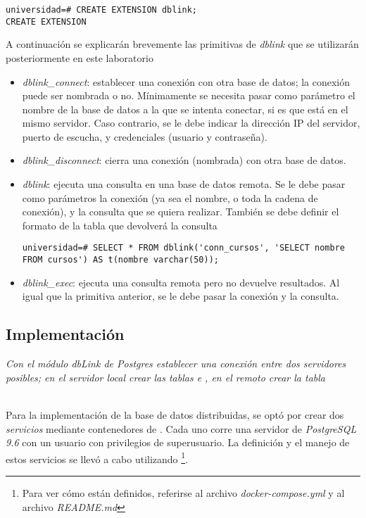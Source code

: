 \vspace*{5mm}
\begin{lstlisting}
universidad=# CREATE EXTENSION dblink;
CREATE EXTENSION
\end{lstlisting}

A continuación se explicarán brevemente las primitivas de \emph{dblink} que se utilizarán posteriormente en este laboratorio
\begin{itemize}
    \item \emph{dblink\_connect}: establecer una conexión con otra base de datos; la conexión puede ser nombrada o no. Mínimamente se necesita pasar como parámetro el nombre de la base de datos a la que se intenta conectar, si es que está en el mismo servidor. Caso contrario, se le debe indicar la dirección IP del servidor, puerto de escucha, y credenciales (usuario y contraseña).
    \item \emph{dblink\_disconnect}: cierra una conexión (nombrada) con otra base de datos. 
    \item \emph{dblink}: ejecuta una consulta en una base de datos remota. Se le debe pasar como parámetros la conexión (ya sea el nombre, o toda la cadena de conexión), y la consulta que se quiera realizar. También se debe definir el formato de la tabla que devolverá la consulta 
    \vspace*{5mm}
    \begin{lstlisting}[title=Consulta remota al sitio de cursos]
    universidad=# SELECT * FROM dblink('conn_cursos', 'SELECT nombre FROM cursos') AS t(nombre varchar(50));
    \end{lstlisting}

    \item \emph{dblink\_exec}: ejecuta una consulta remota pero no devuelve resultados. Al igual que la primitiva anterior, se le debe pasar la conexión y la consulta. 
\end{itemize}

\subsection{Implementación}
\emph{Con el módulo dbLink de Postgres establecer una conexión entre dos servidores posibles; en el servidor local crear las tablas  e , en el remoto crear la tabla } 

~\\

Para la implementación de la base de datos distribuidas, se optó por crear dos \emph{servicios} mediante contenedores de \docker{}. Cada uno corre una servidor de \emph{PostgreSQL 9.6} con un usuario con privilegios de superusuario. La definición y el manejo de estos servicios se llevó a cabo utilizando \doccom{} \footnote{Para ver cómo están definidos, referirse al archivo \emph{docker-compose.yml} y al archivo \emph{README.md}}.

